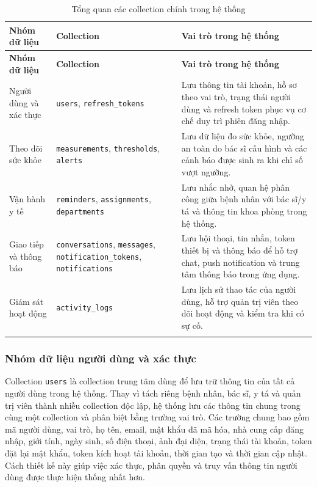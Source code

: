 \begin{center}
\begin{longtable}{|p{3.2cm}|p{4.2cm}|p{6.3cm}|}
    \hline
    \textbf{Nhóm dữ liệu} & \textbf{Collection} & \textbf{Vai trò trong hệ thống} \\
    \hline
    \endfirsthead
    \hline
    \textbf{Nhóm dữ liệu} & \textbf{Collection} & \textbf{Vai trò trong hệ thống} \\
    \hline
    \endhead

    Người dùng và xác thực &
    \texttt{users}, \texttt{refresh\_tokens} &
    Lưu thông tin tài khoản, hồ sơ theo vai trò, trạng thái người dùng và refresh token phục vụ cơ chế duy trì phiên đăng nhập. \\
    \hline

    Theo dõi sức khỏe &
    \texttt{measurements}, \texttt{thresholds}, \texttt{alerts} &
    Lưu dữ liệu đo sức khỏe, ngưỡng an toàn do bác sĩ cấu hình và các cảnh báo được sinh ra khi chỉ số vượt ngưỡng. \\
    \hline

    Vận hành y tế &
    \texttt{reminders}, \texttt{assignments}, \texttt{departments} &
    Lưu nhắc nhở, quan hệ phân công giữa bệnh nhân với bác sĩ/y tá và thông tin khoa phòng trong hệ thống. \\
    \hline

    Giao tiếp và thông báo &
    \texttt{conversations}, \texttt{messages}, \texttt{notification\_tokens}, \texttt{notifications} &
    Lưu hội thoại, tin nhắn, token thiết bị và thông báo để hỗ trợ chat, push notification và trung tâm thông báo trong ứng dụng. \\
    \hline

    Giám sát hoạt động &
    \texttt{activity\_logs} &
    Lưu lịch sử thao tác của người dùng, hỗ trợ quản trị viên theo dõi hoạt động và kiểm tra khi có sự cố. \\
    \hline

    \caption{Tổng quan các collection chính trong hệ thống}
    \label{chapter3-table-db-collections}
\end{longtable}
\end{center}

\subsubsection{Nhóm dữ liệu người dùng và xác thực}

\par Collection \texttt{users} là collection trung tâm dùng để lưu trữ thông tin của tất cả người dùng trong hệ thống. Thay vì tách riêng bệnh nhân, bác sĩ, y tá và quản trị viên thành nhiều collection độc lập, hệ thống lưu các thông tin chung trong cùng một collection và phân biệt bằng trường vai trò. Các trường chung bao gồm mã người dùng, vai trò, họ tên, email, mật khẩu đã mã hóa, nhà cung cấp đăng nhập, giới tính, ngày sinh, số điện thoại, ảnh đại diện, trạng thái tài khoản, token đặt lại mật khẩu, token kích hoạt tài khoản, thời gian tạo và thời gian cập nhật. Cách thiết kế này giúp việc xác thực, phân quyền và truy vấn thông tin người dùng được thực hiện thống nhất hơn.

